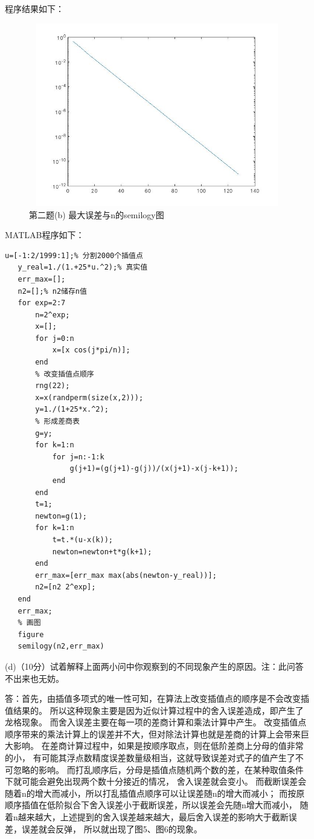 \documentclass[12pt,a4paper,utf8]{ctexart}
\begin{document}
\begin{enumerate}
程序结果如下：
\begin{figure}[htbp]
   \centering
   \includegraphics[width=15cm,height=8cm]{ex2c.jpg}
   \caption{第二题(b) 最大误差与n的semilogy图}
\end{figure}

MATLAB程序如下：
\begin{lstlisting}[frame=single]
   u=[-1:2/1999:1];% 分割2000个插值点
   y_real=1./(1.+25*u.^2);% 真实值
   err_max=[];
   n2=[];% n2储存n值
   for exp=2:7
       n=2^exp;
       x=[];
       for j=0:n
           x=[x cos(j*pi/n)];
       end
       % 改变插值点顺序
       rng(22);
       x=x(randperm(size(x,2)));
       y=1./(1+25*x.^2);
       % 形成差商表
       g=y;
       for k=1:n
           for j=n:-1:k
               g(j+1)=(g(j+1)-g(j))/(x(j+1)-x(j-k+1));
           end
       end
       t=1;
       newton=g(1);
       for k=1:n
           t=t.*(u-x(k));
           newton=newton+t*g(k+1);
       end
       err_max=[err_max max(abs(newton-y_real))];
       n2=[n2 2^exp];
   end
   err_max;
   % 画图
   figure
   semilogy(n2,err_max)
\end{lstlisting}

(d)（10分）试着解释上面两小问中你观察到的不同现象产生的原因。注：此问答不出来也无妨。

答：首先，由插值多项式的唯一性可知，在算法上改变插值点的顺序是不会改变插值结果的。
所以这种现象主要是因为近似计算过程中的舍入误差造成，即产生了龙格现象。
而舍入误差主要在每一项的差商计算和乘法计算中产生。
改变插值点顺序带来的乘法计算上的误差并不大，但对除法计算也就是差商的计算上会带来巨大影响。
在差商计算过程中，如果是按顺序取点，则在低阶差商上分母的值非常的小，
有可能其浮点数精度误差数量级相当，这就导致误差对式子的值产生了不可忽略的影响。
而打乱顺序后，分母是插值点随机两个数的差，在某种取值条件下就可能会避免出现两个数十分接近的情况，
舍入误差就会变小。
而截断误差会随着n的增大而减小，所以打乱插值点顺序可以让误差随n的增大而减小；
而按原顺序插值在低阶拟合下舍入误差小于截断误差，所以误差会先随n增大而减小，
随着n越来越大，上述提到的舍入误差越来越大，最后舍入误差的影响大于截断误差，误差就会反弹，
所以就出现了图5、图6的现象。






\end{enumerate}
\end{document}
